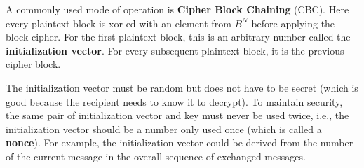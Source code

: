 A commonly used mode of operation is \textbf{Cipher Block Chaining} (CBC).
Here every plaintext block is xor-ed with an element from $B^N$ before applying the block cipher.
For the first plaintext block, this is an arbitrary number called the \textbf{initialization vector}.
For every subsequent plaintext block, it is the previous cipher block.

The initialization vector must be random but does not have to be secret (which is good because the recipient needs to know it to decrypt).
To maintain security, the same pair of initialization vector and key must never be used twice, i.e., the initialization vector should be a number only used once (which is called a \textbf{nonce}).
For example, the initialization vector could be derived from the number of the current message in the overall sequence of exchanged messages.

